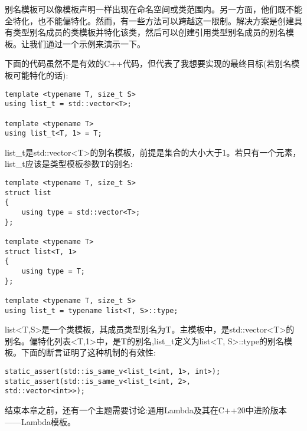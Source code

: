 别名模板可以像模板声明一样出现在命名空间或类范围内。另一方面，他们既不能全特化，也不能偏特化。然而，有一些方法可以跨越这一限制。解决方案是创建具有类型别名成员的类模板并特化该类，然后可以创建引用类型别名成员的别名模板。让我们通过一个示例来演示一下。

下面的代码虽然不是有效的C++代码，但代表了我想要实现的最终目标(若别名模板可能特化的话):

\begin{lstlisting}[style=styleCXX]
template <typename T, size_t S>
using list_t = std::vector<T>;

template <typename T>
using list_t<T, 1> = T;
\end{lstlisting}

list\_t是std::vector<T>的别名模板，前提是集合的大小大于1。若只有一个元素，list\_t应该是类型模板参数T的别名:

\begin{lstlisting}[style=styleCXX]
template <typename T, size_t S>
struct list
{
	using type = std::vector<T>;
};

template <typename T>
struct list<T, 1>
{
	using type = T;
};

template <typename T, size_t S>
using list_t = typename list<T, S>::type;
\end{lstlisting}

list<T,S>是一个类模板，其成员类型别名为T。主模板中，是std::vector<T>的别名。偏特化列表<T,1>中，是T的别名,list\_t定义为list<T, S>::type的别名模板。下面的断言证明了这种机制的有效性:

\begin{lstlisting}[style=styleCXX]
static_assert(std::is_same_v<list_t<int, 1>, int>);
static_assert(std::is_same_v<list_t<int, 2>,
std::vector<int>>);
\end{lstlisting}

结束本章之前，还有一个主题需要讨论:通用Lambda及其在C++20中进阶版本——Lambda模板。




















